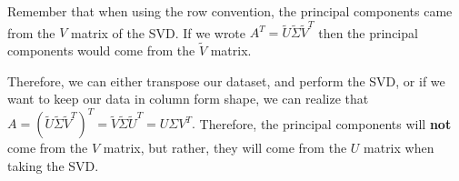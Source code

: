 \begin{enumerate}
{    Remember that when using the row convention, the principal components came from the $V$ matrix of the SVD.
    If we wrote $A^{T} = \tilde{U} \tilde{\Sigma} \tilde{V}^{T}$ then the principal components would come from the $\tilde{V}$ matrix.

    Therefore, we can either transpose our dataset, and perform the SVD, or if we want to keep our data in column form shape, we can realize that $A = (\tilde{U} \tilde{\Sigma} \tilde{V}^{T})^{T} = \tilde{V} \tilde{\Sigma} \tilde{U}^{T} = U \Sigma V^{T}.$
    Therefore, the principal components will \textbf{not} come from the $V$ matrix, but rather, they will come from the $U$ matrix when taking the SVD.
	}

\end{enumerate}
